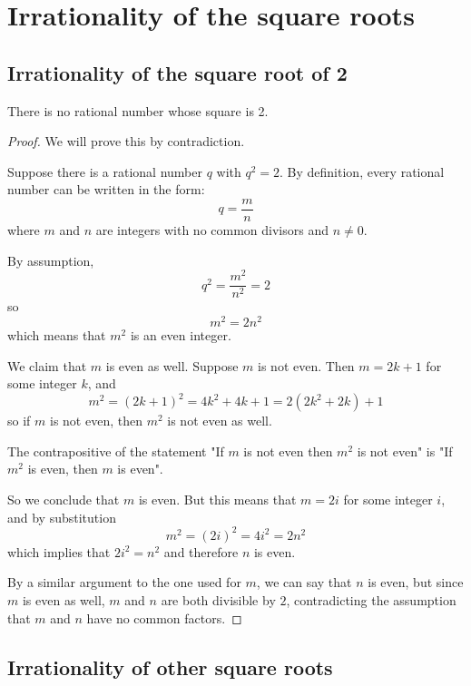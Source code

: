 \section{Irrationality of the square roots}
\subsection{Irrationality of the square root of 2}
\begin{theorem}
There is no rational number whose square is 2.
\end{theorem}

\begin{proof} 
We will prove this by contradiction.  
\par\vspace{0.3 cm}
Suppose there is a rational number $q$ with $q^2=2$.  By definition, every rational number can be written in the form:
\[
q = \frac{m}{n} 
\]
where $m$ and $n$ are integers with no common divisors and $n\neq0$.
\par\vspace{0.3 cm}
By assumption,
\[
q^2 = \frac{m^2}{n^2} = 2
\]
so
\[
m^2 = 2n^2
\]
which means that $m^2$ is an even integer.  
\par\vspace{0.3 cm}
We claim that $m$ is even as well.  Suppose $m$ is not even.  Then $m=2k+1$ for some integer $k$, and 
\[
m^2 = (2k+1)^2 = 4k^2+4k+1 = 2(2k^2+2k)+1
\]
so if $m$ is not even, then $m^2$ is not even as well.  
\par\vspace{0.3 cm}
The contrapositive of the statement "If $m$ is not even then $m^2$ is not even" is "If $m^2$ is even, then $m$ is even".
\par\vspace{0.3 cm}
So we conclude that $m$ is even.  But this means that $m = 2i$ for some integer $i$, and by substitution
\[
m^2 = (2i)^2 = 4i^2 =2n^2
\]
which implies that $2i^2 = n^2$ and therefore $n$ is even.  
\par\vspace{0.3 cm}
By a similar argument to the one used for $m$, we can say that $n$ is even, but since $m$ is even as well, $m$ and $n$ are both divisible by $2$, contradicting the assumption that $m$ and $n$ have no common factors.
\end{proof}
\subsection{Irrationality of other square roots}
